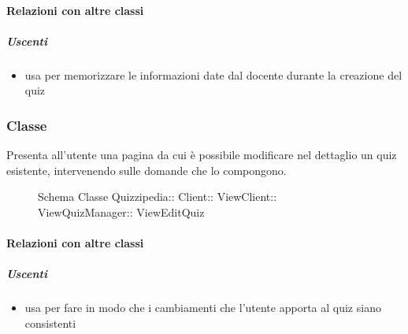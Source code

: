 \paragraph{Relazioni con altre classi}
\subparagraph{Uscenti}
\begin{itemize}
\item usa  per memorizzare le informazioni date dal docente durante la creazione del quiz
\end{itemize}
\subsubsection{Classe }
Presenta all'utente una pagina da cui è possibile modificare nel dettaglio un quiz esistente, intervenendo sulle domande che lo compongono.
\begin{figure}[H]
\centering
\noindent{}
\caption[Schema Classe ViewEditQuiz]{Schema Classe Quizzipedia:: Client:: ViewClient:: ViewQuizManager:: ViewEditQuiz}
\end{figure}
\paragraph{Relazioni con altre classi}
\subparagraph{Uscenti}
\begin{itemize}
\item usa  per fare in modo che i cambiamenti che l'utente apporta al quiz siano consistenti
\end{itemize}
